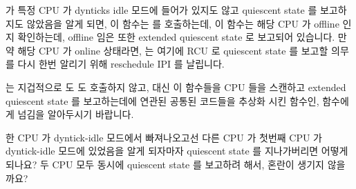  가 특정 CPU 가 dynticks idle 모드에 들어가
있지도 않고 quiescent state 를 보고하지도 않았음을 알게 되면, 이 함수는
 를 호출하는데, 이 함수는 해당 CPU 가 offline
인지 확인하는데, offline 임은 또한 extended quiescent state 로 보고되어
있습니다.
만약 해당 CPU 가 online 상태라면,  는 여기에 RCU
로 quiescent state 를 보고할 의무를 다시 한번 알리기 위해 reschedule IPI 를
날립니다.

 는 지겁적으로 
도  도 호출하지 않고, 대신 이 함수들을 CPU 들을
스캔하고 extended quiescent state 를 보고하는데에 연관된 공통된 코드들을 추상화
시킨 함수인,  함수에게 넘김을 알아두시기 바랍니다.
\iffalse

In the third phase (\co{RCU_FORCE_QS}), the
\co{rcu_implicit_dynticks_qs()} function again scans the CPUs
that have not yet reported a quiescent state (either explicitly or
implicitly during the \co{RCU_SAVE_DYNTICK} phase), again checking the
per-CPU \co{dynticks} and \co{dynticks_nmi} counters.
If each of these has either changed in value or is now even, then
the corresponding CPU has either passed through or is now in dynticks
idle, which as before is noted as an extended quiescent state.

If \co{rcu_implicit_dynticks_qs()} finds that a given CPU
has neither been in dynticks idle mode nor reported a quiescent state,
it invokes \co{rcu_implicit_offline_qs()}, which checks to see
if that CPU is offline, which is also reported as an extended quiescent
state.
If the CPU is online, then \co{rcu_implicit_offline_qs()} sends
it a reschedule IPI in an attempt to remind it of its duty to report
a quiescent state to RCU.

Note that \co{force_quiescent_state()} does not directly
invoke either \co{dyntick_save_progress_counter()} or
\co{rcu_implicit_dynticks_qs()}, instead passing these functions
to an intervening \co{rcu_process_dyntick()} function that
abstracts out the common code involved in scanning the CPUs and reporting
extended quiescent states.
\fi

\QuickQuiz{}
	한 CPU 가 dyntick-idle 모드에서 빠져나오고선 다른 CPU 가 첫번째 CPU 가
	dyntick-idle 모드에 있었음을 알게 되자마자 quiescent state 를
	지나가버리면 어떻게 되나요?
	두 CPU 모두 동시에 quiescent state 를 보고하려 해서, 혼란이 생기지
	않을까요?
	\iffalse

